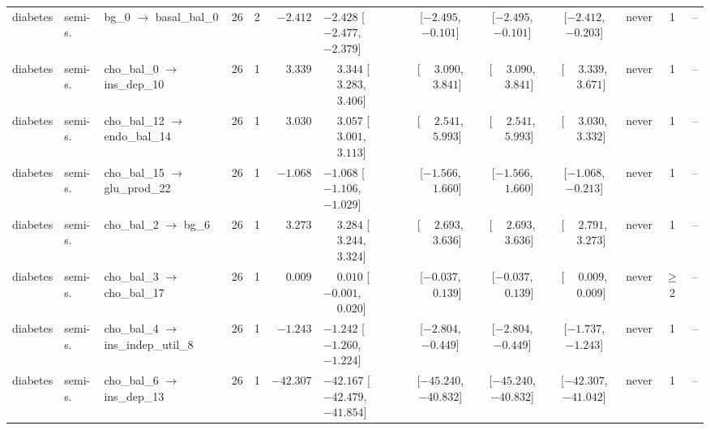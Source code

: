 \begin{landscape}
\begin{longtable}{@{}llp{2.15cm}ccrl cccc c l@{}}
diabetes & semi-s. & bg\_\allowbreak{}0 $\to$ basal\_\allowbreak{}bal\_\allowbreak{}0 & 26 & 2 & $-2.412$ & $-2.428$ [$-2.477$, $-2.379$] & [$-2.495$, $-0.101$] & [$-2.495$, $-0.101$] & [$-2.412$, $-0.203$] & never & 1 & -- \\
diabetes & semi-s. & cho\_\allowbreak{}bal\_\allowbreak{}0 $\to$ ins\_\allowbreak{}dep\_\allowbreak{}10 & 26 & 1 & $\phantom{-}3.339$ & $\phantom{-}3.344$ [$\phantom{-}3.283$, $\phantom{-}3.406$] & [$\phantom{-}3.090$, $\phantom{-}3.841$] & [$\phantom{-}3.090$, $\phantom{-}3.841$] & [$\phantom{-}3.339$, $\phantom{-}3.671$] & never & 1 & -- \\
diabetes & semi-s. & cho\_\allowbreak{}bal\_\allowbreak{}12 $\to$ endo\_\allowbreak{}bal\_\allowbreak{}14 & 26 & 1 & $\phantom{-}3.030$ & $\phantom{-}3.057$ [$\phantom{-}3.001$, $\phantom{-}3.113$] & [$\phantom{-}2.541$, $\phantom{-}5.993$] & [$\phantom{-}2.541$, $\phantom{-}5.993$] & [$\phantom{-}3.030$, $\phantom{-}3.332$] & never & 1 & -- \\
diabetes & semi-s. & cho\_\allowbreak{}bal\_\allowbreak{}15 $\to$ glu\_\allowbreak{}prod\_\allowbreak{}22 & 26 & 1 & $-1.068$ & $-1.068$ [$-1.106$, $-1.029$] & [$-1.566$, $\phantom{-}1.660$] & [$-1.566$, $\phantom{-}1.660$] & [$-1.068$, $-0.213$] & never & 1 & -- \\
diabetes & semi-s. & cho\_\allowbreak{}bal\_\allowbreak{}2 $\to$ bg\_\allowbreak{}6 & 26 & 1 & $\phantom{-}3.273$ & $\phantom{-}3.284$ [$\phantom{-}3.244$, $\phantom{-}3.324$] & [$\phantom{-}2.693$, $\phantom{-}3.636$] & [$\phantom{-}2.693$, $\phantom{-}3.636$] & [$\phantom{-}2.791$, $\phantom{-}3.273$] & never & 1 & -- \\
diabetes & semi-s. & cho\_\allowbreak{}bal\_\allowbreak{}3 $\to$ cho\_\allowbreak{}bal\_\allowbreak{}17 & 26 & 1 & $\phantom{-}0.009$ & $\phantom{-}0.010$ [$-0.001$, $\phantom{-}0.020$] & [$-0.037$, $\phantom{-}0.139$] & [$-0.037$, $\phantom{-}0.139$] & [$\phantom{-}0.009$, $\phantom{-}0.009$] & never & $\geq$2 & -- \\
diabetes & semi-s. & cho\_\allowbreak{}bal\_\allowbreak{}4 $\to$ ins\_\allowbreak{}indep\_\allowbreak{}util\_\allowbreak{}8 & 26 & 1 & $-1.243$ & $-1.242$ [$-1.260$, $-1.224$] & [$-2.804$, $-0.449$] & [$-2.804$, $-0.449$] & [$-1.737$, $-1.243$] & never & 1 & -- \\
diabetes & semi-s. & cho\_\allowbreak{}bal\_\allowbreak{}6 $\to$ ins\_\allowbreak{}dep\_\allowbreak{}13 & 26 & 1 & $-42.307$ & $-42.167$ [$-42.479$, $-41.854$] & [$-45.240$, $-40.832$] & [$-45.240$, $-40.832$] & [$-42.307$, $-41.042$] & never & 1 & -- \\

\end{longtable}
\end{landscape}
